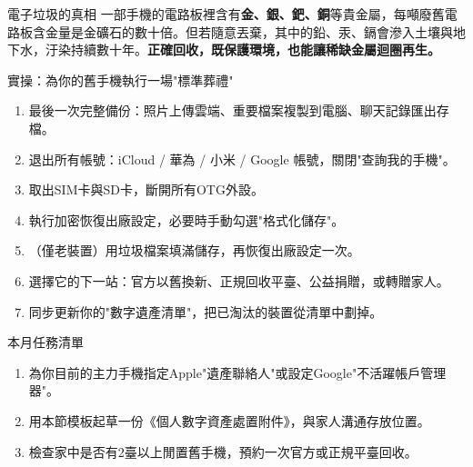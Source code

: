 \begin{tcbinfo}{電子垃圾的真相}
一部手機的電路板裡含有\textbf{金、銀、鈀、銅}等貴金屬，每噸廢舊電路板含金量是金礦石的數十倍。但若隨意丟棄，其中的鉛、汞、鎘會滲入土壤與地下水，汙染持續數十年。\textbf{正確回收，既保護環境，也能讓稀缺金屬迴圈再生。}

\end{tcbinfo}

\begin{tcbpractice}{實操：為你的舊手機執行一場"標準葬禮"}
\begin{enumerate}
  \item 最後一次完整備份：照片上傳雲端、重要檔案複製到電腦、聊天記錄匯出存檔。
  \item 退出所有帳號：iCloud / 華為 / 小米 / Google 帳號，關閉"查詢我的手機"。
  \item 取出SIM卡與SD卡，斷開所有OTG外設。
  \item 執行加密恢復出廠設定，必要時手動勾選"格式化儲存"。
  \item （僅老裝置）用垃圾檔案填滿儲存，再恢復出廠設定一次。
  \item 選擇它的下一站：官方以舊換新、正規回收平臺、公益捐贈，或轉贈家人。
  \item 同步更新你的"數字遺產清單"，把已淘汰的裝置從清單中劃掉。
\end{enumerate}

\end{tcbpractice}

\begin{tcbpractice}{本月任務清單}
\begin{enumerate}
  \item 為你目前的主力手機指定Apple"遺產聯絡人"或設定Google"不活躍帳戶管理器"。
  \item 用本節模板起草一份《個人數字資產處置附件》，與家人溝通存放位置。
  \item 檢查家中是否有2臺以上閒置舊手機，預約一次官方或正規平臺回收。
\end{enumerate}

\end{tcbpractice}
